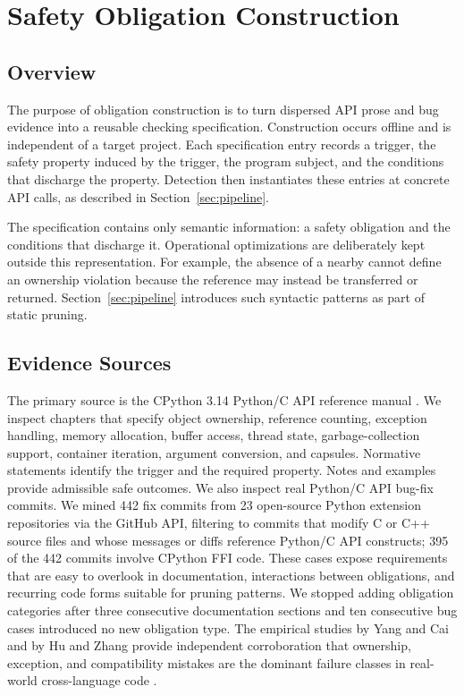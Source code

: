 \section{Safety Obligation Construction}
\label{sec:construction}

\subsection{Overview}

The purpose of obligation construction is to turn dispersed API prose and bug
evidence into a reusable checking specification. Construction occurs offline
and is independent of a target project. Each specification entry records a
trigger, the safety property induced by the trigger, the program subject, and
the conditions that discharge the property. Detection then instantiates these
entries at concrete API calls, as described in
Section~\ref{sec:pipeline}.

The specification contains only semantic information: a safety obligation and
the conditions that discharge it. Operational optimizations are deliberately
kept outside this representation. For example, the absence of a nearby
 cannot define an ownership violation because the reference
may instead be transferred or returned. Section~\ref{sec:pipeline} introduces
such syntactic patterns as part of static pruning.

\subsection{Evidence Sources}

The primary source is the CPython 3.14 Python/C API reference manual
\cite{pythoncapi}. We inspect chapters that specify object ownership,
reference counting, exception handling, memory allocation, buffer access,
thread state, garbage-collection support, container iteration, argument
conversion, and capsules. Normative statements identify the trigger and the
required property. Notes and examples provide admissible safe outcomes. We
also inspect real Python/C API bug-fix commits. We mined 442 fix commits
from 23 open-source Python extension repositories via the GitHub API,
filtering to commits that modify C or C++ source files and whose messages or
diffs reference Python/C API constructs; 395 of the 442 commits involve
CPython FFI code. These cases expose requirements that are easy to overlook in
documentation, interactions between obligations, and recurring code forms
suitable for pruning patterns. We stopped adding obligation categories after
three consecutive documentation sections and ten consecutive bug cases
introduced no new obligation type. The empirical studies by Yang and Cai and
by Hu and Zhang provide independent corroboration that ownership, exception,
and compatibility mistakes are the dominant failure classes in real-world
cross-language code \cite{yang2025dissecting,hu2020pythoncapi}.

